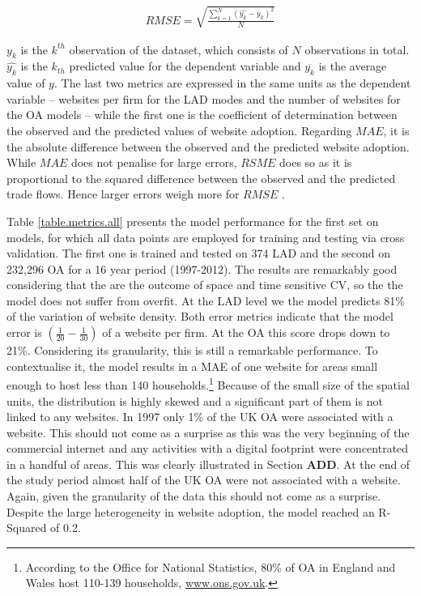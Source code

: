 \documentclass[
  authoryear,
  preprint,
  3p]{elsarticle}
\begin{document}
\begin{align}
RMSE =  \sqrt{\frac{\sum_{k = 1}^{N} (\hat{y_{k}} - y_{k})^2} {N}} \label{eq:rmse}
\end{align}

\(y_{k}\) is the \(k^{th}\) observation of the dataset, which consists
of \(N\) observations in total. \(\hat{y_{k}}\) is the \(k_{th}\)
predicted value for the dependent variable and \(\overline{y_{k}}\) is
the average value of \(y\). The last two metrics are expressed in the
same units as the dependent variable -- websites per firm for the LAD
modes and the number of websites for the OA models -- while the first
one is the coefficient of determination between the observed and the
predicted values of website adoption. Regarding \(MAE\), it is the
absolute difference between the observed and the predicted website
adoption. While \(MAE\) does not penalise for large errors, \(RSME\)
does so as it is proportional to the squared difference between the
observed and the predicted trade flows. Hence larger errors weigh more
for \(RMSE\) \citep{pontius2008components}.

Table \ref{table.metrics.all} presents the model performance for the
first set on models, for which all data points are employed for training
and testing via cross validation. The first one is trained and tested on
374 LAD and the second on 232,296 OA for a 16 year period (1997-2012).
The results are remarkably good considering that the are the outcome of
space and time sensitive CV, so the the model does not suffer from
overfit. At the LAD level we the model predicts 81\% of the variation of
website density. Both error metrics indicate that the model error is
\((\frac{1}{20} - \frac{1}{30})\) of a website per firm. At the OA this
score drops down to 21\%. Considering its granularity, this is still a
remarkable performance. To contextualise it, the model results in a MAE
of one website for areas small enough to host less than 140
households.\footnote{According to the Office for National Statistics,
  80\% of OA in England and Wales host 110-139 households,
  \href{https://www.ons.gov.uk/census/2001censusandearlier/dataandproducts/outputgeography/outputareas}{www.ons.gov.uk}.}
Because of the small size of the spatial units, the distribution is
highly skewed and a significant part of them is not linked to any
websites. In 1997 only 1\% of the UK OA were associated with a website.
This should not come as a surprise as this was the very beginning of the
commercial internet and any activities with a digital footprint were
concentrated in a handful of areas. This was clearly illustrated in
Section \textbf{ADD}. At the end of the study period almost half of the
UK OA were not associated with a website. Again, given the granularity
of the data this should not come as a surprise. Despite the large
heterogeneity in website adoption, the model reached an R-Squared of
0.2.
\end{document}
